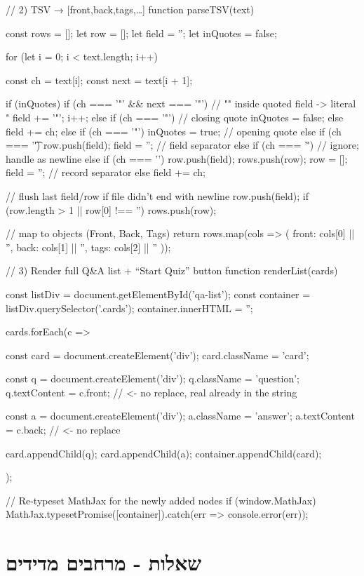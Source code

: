 \documentclass{tstextbook}
\begin{document}
    // 2) TSV → [{front,back,tags},…]
    function parseTSV(text) {
  const rows = [];
  let row = [];
  let field = '';
  let inQuotes = false;

  for (let i = 0; i < text.length; i++) {
    const ch = text[i];
    const next = text[i + 1];

    if (inQuotes) {
      if (ch === '"' && next === '"') {
        // "" inside quoted field -> literal "
        field += '"';
        i++;
      } else if (ch === '"') {
        // closing quote
        inQuotes = false;
      } else {
        field += ch;
      }
    } else {
      if (ch === '"') {
        inQuotes = true;                // opening quote
      } else if (ch === '\t') {
        row.push(field); field = '';    // field separator
      } else if (ch === '\r') {
        // ignore; handle \n as newline
      } else if (ch === '\n') {
        row.push(field); rows.push(row);
        row = []; field = '';           // record separator
      } else {
        field += ch;
      }
    }
  }
  // flush last field/row if file didn't end with newline
  row.push(field);
  if (row.length > 1 || row[0] !== '') rows.push(row);

  // map to objects (Front, Back, Tags)
  return rows.map(cols => ({
    front: cols[0] || '',
    back:  cols[1] || '',
    tags:  cols[2] || ''
  }));
}
// 3) Render full Q&A list + “Start Quiz” button
function renderList(cards) {
  const listDiv = document.getElementById('qa-list');
  const container = listDiv.querySelector('.cards');
  container.innerHTML = '';

  cards.forEach(c => {
    const card = document.createElement('div');
    card.className = 'card';

    const q = document.createElement('div');
    q.className = 'question';
    q.textContent = c.front;   // <- no replace, real \n already in the string

    const a = document.createElement('div');
    a.className = 'answer';
    a.textContent = c.back;    // <- no replace

    card.appendChild(q);
    card.appendChild(a);
    container.appendChild(card);
  });

  // Re-typeset MathJax for the newly added nodes
  if (window.MathJax) {
    MathJax.typesetPromise([container]).catch(err => console.error(err));
  }
}
  \section{שאלות - מרחבים מדידים}
\end{document}
